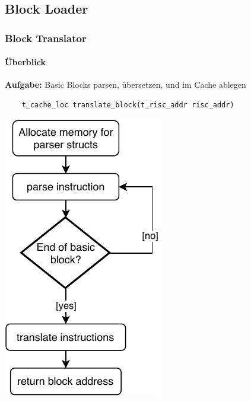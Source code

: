 \documentclass[german]{tum-presentation}
\begin{document}
\subsection{Block Loader} %
\begin{frame}[fragile]
	\frametitle{Block Translator}
	\framesubtitle{Überblick}
	\textbf{Aufgabe:}	Basic Blocks parsen, übersetzen, und im Cache ablegen
	\begin{lstlisting}
	t_cache_loc translate_block(t_risc_addr risc_addr)
	\end{lstlisting}
	\pause
	\includegraphics[width=\textwidth]{diagrams/blocktranslate}
\end{frame}
\end{document}
